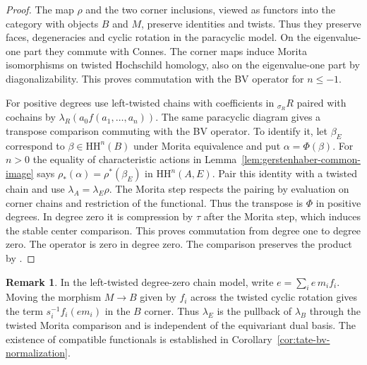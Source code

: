 \documentclass[12pt,a4paper,english,reqno]{amsart}
\numberwithin{equation}{section}
\theoremstyle{plain}
\theoremstyle{definition}
\newtheorem{remark}[theorem]{Remark}
\begin{document}
\begin{proof}
The map $\rho$ and the two corner inclusions, viewed as functors
into the category with objects $B$ and $M$, preserve identities
and twists. Thus they preserve faces, degeneracies and cyclic
rotation in the paracyclic model. On the eigenvalue-one part
they commute with Connes. The corner maps induce Morita
isomorphisms on twisted Hochschild homology, also on the
eigenvalue-one part by diagonalizability. This proves
commutation with the BV operator for $n\le-1$.

For positive degrees use left-twisted chains with coefficients
in $ {}_{\sigma_R}R$ paired with cochains by
$\lambda_R(a_0 f(a_1,\ldots,a_n))$. The same paracyclic diagram
gives a transpose comparison commuting with the BV operator.
To identify it, let $\beta_E$ correspond to $\beta\in\mathrm{HH}^n(B)$
under Morita equivalence and put $\alpha=\Phi(\beta)$. For $n>0$
the equality of characteristic actions in
Lemma~\ref{lem:gerstenhaber-common-image} says
$\rho_*(\alpha)=\rho^*(\beta_E)$ in $\mathrm{HH}^n(A,E)$.
Pair this identity with a twisted chain and use
$\lambda_A=\lambda_E\rho$. The Morita step respects the pairing
by evaluation on corner chains and restriction of the functional.
Thus the transpose is $\Phi$ in positive degrees.
In degree zero it is compression by $\tau$ after the Morita step,
which induces the stable center comparison. This proves
commutation from degree one to degree zero. The operator is
zero in degree zero. The comparison preserves the product by
\cite[Theorem~6.2]{Wang2021Gerstenhaber}.
\end{proof}

\begin{remark}
In the left-twisted degree-zero chain model, write
$e=\sum_i e\,m_i f_i$. Moving the morphism $M\to B$ given
by $f_i$ across the twisted cyclic rotation gives the term
$s_i^{-1}f_i(e m_i)$ in the $B$ corner. Thus $\lambda_E$
is the pullback of $\lambda_B$ through the twisted Morita
comparison and is independent of the equivariant dual basis.
The existence of compatible functionals is established in
Corollary~\ref{cor:tate-bv-normalization}.
\end{remark}
\end{document}
